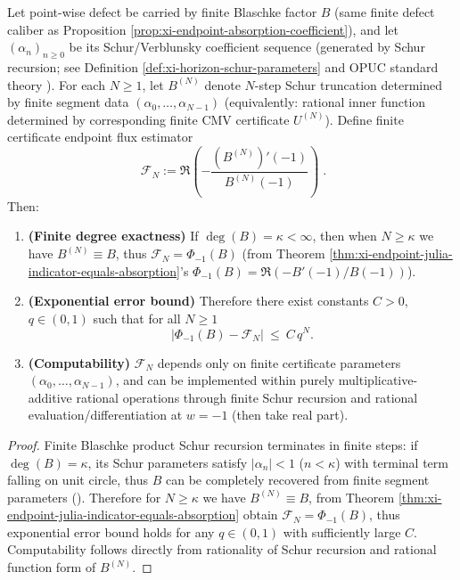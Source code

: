 \begin{theorem}\label{thm:xi-endpoint-flux-finite-cmv-computable}
Let point-wise defect be carried by finite Blaschke factor \(B\) (same finite defect caliber as Proposition \ref{prop:xi-endpoint-absorption-coefficient}), and let \((\alpha_n)_{n\ge 0}\) be its Schur/Verblunsky coefficient sequence (generated by Schur recursion; see Definition \ref{def:xi-horizon-schur-parameters} and OPUC standard theory \cite{Simon2005OPUC1}).
For each \(N\ge 1\), let \(B^{(N)}\) denote \(N\)-step Schur truncation determined by finite segment data \((\alpha_0,\dots,\alpha_{N-1})\) (equivalently: rational inner function determined by corresponding finite CMV certificate \(U^{(N)}\)).
Define finite certificate endpoint flux estimator
\[
\boxed{\;
\mathcal{F}_N:=\Re\!\left(-\frac{(B^{(N)})'(-1)}{B^{(N)}(-1)}\right)\; }.
\]
Then:
\begin{enumerate}
  \item \textbf{(Finite degree exactness)} If \(\deg(B)=\kappa<\infty\), then when \(N\ge \kappa\) we have \(B^{(N)}\equiv B\), thus \(\mathcal{F}_N=\Phi_{-1}(B)\) (from Theorem \ref{thm:xi-endpoint-julia-indicator-equals-absorption}'s \(\Phi_{-1}(B)=\Re(-B'(-1)/B(-1))\)).
  \item \textbf{(Exponential error bound)} Therefore there exist constants \(C>0\), \(q\in(0,1)\) such that for all \(N\ge 1\)
  \[
  \bigl|\Phi_{-1}(B)-\mathcal{F}_N\bigr|\ \le\ C\,q^{N}.
  \]
  \item \textbf{(Computability)} \(\mathcal{F}_N\) depends only on finite certificate parameters \((\alpha_0,\dots,\alpha_{N-1})\), and can be implemented within purely multiplicative-additive rational operations through finite Schur recursion and rational evaluation/differentiation at \(w=-1\) (then take real part).
\end{enumerate}
\end{theorem}

\begin{proof}
Finite Blaschke product Schur recursion terminates in finite steps: if \(\deg(B)=\kappa\), its Schur parameters satisfy \(|\alpha_n|<1\) (\(n<\kappa\)) with terminal term falling on unit circle, thus \(B\) can be completely recovered from finite segment parameters (\cite{Simon2005OPUC1}).
Therefore for \(N\ge\kappa\) we have \(B^{(N)}\equiv B\), from Theorem \ref{thm:xi-endpoint-julia-indicator-equals-absorption} obtain \(\mathcal{F}_N=\Phi_{-1}(B)\), thus exponential error bound holds for any \(q\in(0,1)\) with sufficiently large \(C\).
Computability follows directly from rationality of Schur recursion and rational function form of \(B^{(N)}\).
\end{proof}

